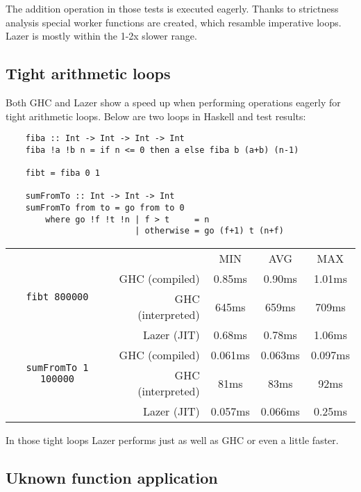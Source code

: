 \documentclass[en]{pracamgr}
\begin{document}
The addition operation in those tests is executed
eagerly. Thanks to strictness analysis special worker
functions are created, which resamble imperative loops.
Lazer is mostly within the 1-2x slower range.

\subsection{Tight arithmetic loops}

Both GHC and Lazer show a speed up when performing
operations eagerly for tight arithmetic loops.
Below are two loops in Haskell and test results:

\begin{verbatim}
    fiba :: Int -> Int -> Int -> Int
    fiba !a !b n = if n <= 0 then a else fiba b (a+b) (n-1)
    
    fibt = fiba 0 1

    sumFromTo :: Int -> Int -> Int
    sumFromTo from to = go from to 0
        where go !f !t !n | f > t     = n
                          | otherwise = go (f+1) t (n+f)
\end{verbatim}

\begin{center}
\begin{tabular}{c r c c c}
    & & MIN & AVG & MAX \\
    \cline{3-5}

    \multirow{2}{*}{\texttt{fibt 800000}}
    & GHC (compiled)& 0.85ms & 0.90ms & 1.01ms \\
    & GHC (interpreted)& 645ms & 659ms & 709ms \\
    & Lazer (JIT)& 0.68ms & 0.78ms & 1.06ms \\
    \cline{2-5}

    \multirow{2}{*}{\texttt{sumFromTo 1 100000}}
    & GHC (compiled)& 0.061ms & 0.063ms & 0.097ms \\
    & GHC (interpreted)& 81ms & 83ms & 92ms \\
    & Lazer (JIT)& 0.057ms & 0.066ms & 0.25ms \\
\end{tabular}
\end{center}

In those tight loops Lazer performs just as well as GHC
or even a little faster.

\subsection{Uknown function application}\label{bench:app}
\end{document}
